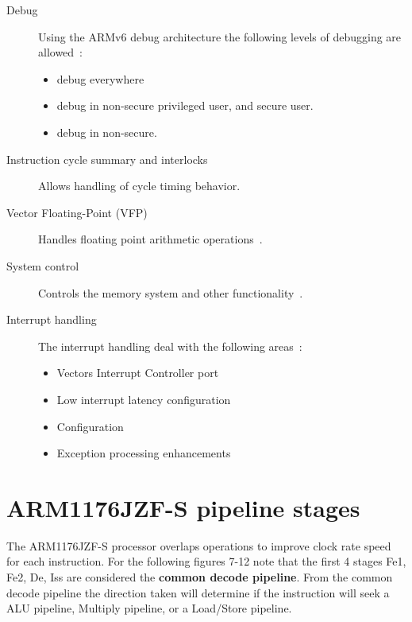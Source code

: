 \documentclass[11pt]{report}
\begin{document}
\begin{description}
\item [Debug] Using the ARMv6 debug architecture the following levels of debugging are allowed~\citep[1-18]{arm1176jzf-s}:
\begin{itemize}
\item debug everywhere
\item debug in non-secure privileged user, and secure user.
\item debug in non-secure.
\end{itemize}
\item [Instruction cycle summary and interlocks] Allows handling of cycle timing behavior.
\item [Vector Floating-Point (VFP)] Handles floating point arithmetic operations~\citep[1-19]{arm1176jzf-s}.
\item [System control] Controls the memory system and other functionality~\citep[1-21]{arm1176jzf-s}.
\item [Interrupt handling] The interrupt handling deal with the following areas~\citep[1-21]{arm1176jzf-s}:
\begin{itemize}
\item Vectors Interrupt Controller port
\item Low interrupt latency configuration
\item Configuration
\item Exception processing enhancements
\end{itemize}
\end{description}
\section{ARM1176JZF-S pipeline stages}
\begin{doublespace}
The ARM1176JZF-S  processor overlaps operations to improve clock rate speed for each instruction. For the following figures 7-12 note that the first 4 stages Fe1, Fe2, De, Iss are considered the \textbf{common decode pipeline}. From the common decode pipeline the direction taken will determine if the instruction will seek a ALU pipeline, Multiply pipeline, or a Load/Store pipeline. 
\end{doublespace}
\end{document}
